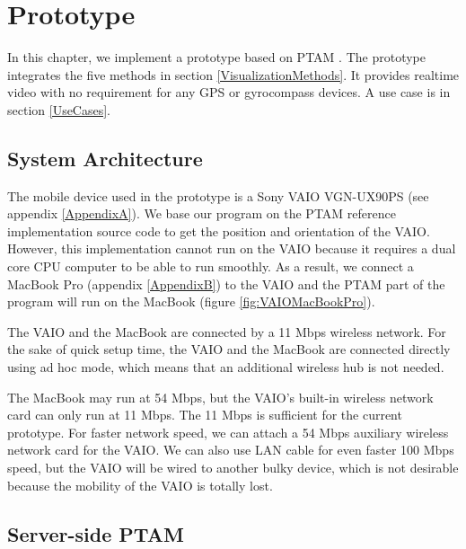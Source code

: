 \chapter{Prototype}
\label{Chapter3}

In this chapter, we implement a prototype based on PTAM \citep{Reference12}. The prototype integrates the five methods in section \ref{VisualizationMethods}. It provides realtime video with no requirement for any GPS or gyrocompass devices. A use case is in section \ref{UseCases}.


\section{System Architecture}

The mobile device used in the prototype is a Sony VAIO VGN-UX90PS (see appendix \ref{AppendixA}). We base our program on the PTAM reference implementation source code \citep{Reference16} to get the position and orientation of the VAIO. However, this implementation cannot run on the VAIO because it requires a dual core CPU computer to be able to run smoothly. As a result, we connect a MacBook Pro (appendix \ref{AppendixB}) to the VAIO and the PTAM part of the program will run on the MacBook (figure \ref{fig:VAIOMacBookPro}).

The VAIO and the MacBook are connected by a 11 Mbps wireless network. For the sake of quick setup time, the VAIO and the MacBook are connected directly using ad hoc mode, which means that an additional wireless hub is not needed.

The MacBook may run at 54 Mbps, but the VAIO's built-in wireless network card can only run at 11 Mbps. The 11 Mbps is sufficient for the current prototype. For faster network speed, we can attach a 54 Mbps auxiliary wireless network card for the VAIO. We can also use LAN cable for even faster 100 Mbps speed, but the VAIO will be wired to another bulky device, which is not desirable because the mobility of the VAIO is totally lost.


\section{Server-side PTAM}

